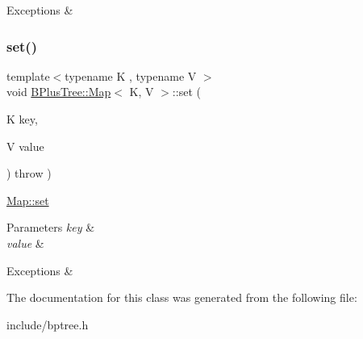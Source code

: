 \begin{DoxyExceptions}{Exceptions}
{\em } & \\
\hline
\end{DoxyExceptions}
\mbox{\label{class_b_plus_tree_1_1_map_ab29d127d6b90f8f7c84270d4f1c034f9}} 
\subsubsection{\texorpdfstring{set()}{set()}}
{\footnotesize\ttfamily template$<$typename K , typename V $>$ \\
void \hyperlink{class_b_plus_tree_1_1_map}{B\+Plus\+Tree\+::\+Map}$<$ K, V $>$\+::set (\begin{DoxyParamCaption}\item[{K}]{key,  }\item[{V}]{value }\end{DoxyParamCaption}) throw  ) }

\hyperlink{class_b_plus_tree_1_1_map_ab29d127d6b90f8f7c84270d4f1c034f9}{Map\+::set}


\begin{DoxyParams}{Parameters}
{\em key} & \\
\hline
{\em value} & \\
\hline
\end{DoxyParams}

\begin{DoxyExceptions}{Exceptions}
{\em } & \\
\hline
\end{DoxyExceptions}


The documentation for this class was generated from the following file\+:\begin{DoxyCompactItemize}
\item 
include/bptree.\+h\end{DoxyCompactItemize}
